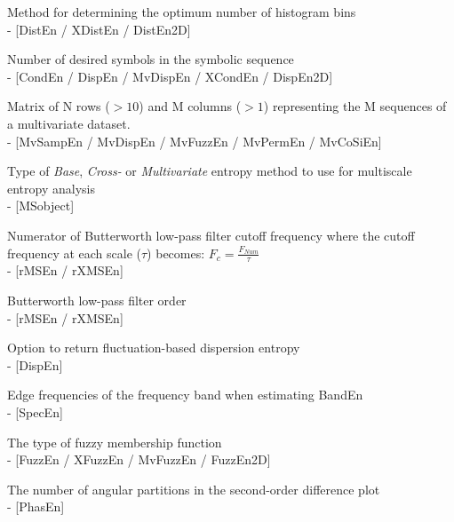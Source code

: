 \documentclass[12pt, a4paper, titlepage, openany]{book}
\begin{document}
\begin{description}[labelsep=1cm, labelwidth=2cm, nosep, style=multiline,leftmargin=3cm]\footnotesize

\item[\texttt{Bins}]		Method for determining the optimum number of histogram bins \\ - [DistEn / XDistEn / DistEn2D]\\
\item[\texttt{c}]		Number of desired symbols in the symbolic sequence \\ - [CondEn / DispEn / MvDispEn / XCondEn / DispEn2D]\\
\item[\texttt{Data}]		Matrix of N rows ($> 10$) and M columns ($> 1$) representing the M sequences of a multivariate dataset. \\ - [MvSampEn / MvDispEn / MvFuzzEn / MvPermEn / MvCoSiEn]\\
\item[\texttt{EnType}]		Type of \textit{Base}, \textit{Cross-} or \textit{Multivariate}  entropy method to use for multiscale entropy analysis \\ - [MSobject]\\
\item[\texttt{F\_Num}]		 Numerator of Butterworth low-pass filter cutoff frequency where the cutoff frequency at each scale ($\tau$) becomes: $F_{c} = \frac{F_{Num}}{\tau}$  \\ - [rMSEn / rXMSEn]\\
\item[\texttt{F\_Order}]		 Butterworth low-pass filter order \\ - [rMSEn / rXMSEn]\\
\item[\texttt{Fluct}]		 Option to return fluctuation-based dispersion entropy \\ - [DispEn]\\
\item[\texttt{Freqs}]		 Edge frequencies of the frequency band when estimating BandEn \\ - [SpecEn]\\
\item[\texttt{Fx}]		 The type of fuzzy membership function \\ - [FuzzEn / XFuzzEn / MvFuzzEn / FuzzEn2D]\\
\item[\texttt{K}]		 The number of angular partitions in the second-order difference plot \\ - [PhasEn]\\

\end{description}
\end{document}
